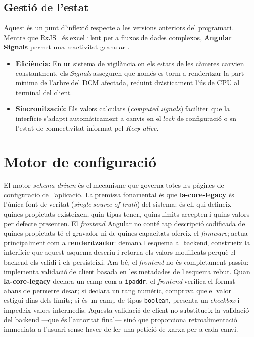 \subsection{Gestió de l'estat}
Aquest és un punt d'inflexió respecte a les versions anteriors del programari. Mentre que RxJS~\cite{rxjs_docs} és excel·lent per a fluxos de dades complexos, \textbf{Angular Signals} permet una reactivitat granular \cite{learning_angular}.
\begin{itemize}
    \item \textbf{Eficiència:} En un sistema de vigilància on els estats de les càmeres canvien constantment, els \textit{Signals} asseguren que només es torni a renderitzar la part mínima de l'arbre del DOM afectada, reduint dràsticament l'ús de CPU al terminal del client.
    \item \textbf{Sincronització:} Els valors calculats (\textit{computed signals}) faciliten que la interfície s'adapti automàticament a canvis en el \textit{lock} de configuració o en l'estat de connectivitat informat pel \textit{Keep-alive}.
\end{itemize}

\section{Motor de configuració}
El motor \textit{schema-driven} és el mecanisme que governa totes les pàgines de configuració de l'aplicació. La premissa fonamental és que \textbf{la-core-legacy} és l'única font de veritat (\textit{single source of truth}) del sistema: és ell qui defineix quines propietats existeixen, quin tipus tenen, quins límits accepten i quins valors per defecte presenten. El \textit{frontend} Angular no conté cap descripció codificada de quines propietats té el gravador ni de quines capacitats ofereix el \textit{firmware}; actua principalment com a \textbf{renderitzador}: demana l'esquema al backend, construeix la interfície que aquest esquema descriu i retorna els valors modificats perquè el backend els validi i els persisteixi. Ara bé, el \textit{frontend} no és completament passiu: implementa validació de client basada en les metadades de l'esquema rebut. Quan \textbf{la-core-legacy} declara un camp com a \texttt{ipaddr}, el \textit{frontend} verifica el format abans de permetre desar; si declara un rang numèric, comprova que el valor estigui dins dels límits; si és un camp de tipus \texttt{boolean}, presenta un \textit{checkbox} i impedeix valors intermedis. Aquesta validació de client no substitueix la validació del backend —que és l'autoritat final— sinó que proporciona retroalimentació immediata a l'usuari sense haver de fer una petició de xarxa per a cada canvi.

